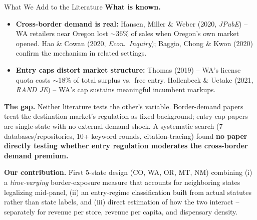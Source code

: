 \documentclass[aspectratio=169,11pt]{beamer}
\begin{document}
\begin{frame}{What We Add to the Literature}
\textbf{What is known.}
\begin{itemize}
\item \textbf{Cross-border demand is real:} Hansen, Miller \& Weber (2020, \emph{JPubE}) -- WA retailers near
Oregon lost $\sim$36\% of sales when Oregon's own market opened. Hao \& Cowan (2020, \emph{Econ.\ Inquiry});
Baggio, Chong \& Kwon (2020) confirm the mechanism in related settings.
\item \textbf{Entry caps distort market structure:} Thomas (2019) -- WA's license quota costs $\sim$18\% of
total surplus vs.\ free entry. Hollenbeck \& Uetake (2021, \emph{RAND JE}) -- WA's cap sustains meaningful
incumbent markups.
\end{itemize}

\vspace{0.4em}
\textbf{The gap.} Neither literature tests the other's variable. Border-demand papers treat the destination
market's regulation as fixed background; entry-cap papers are single-state with no external demand shock. A
systematic search (7 databases/repositories, 10+ keyword rounds, citation-tracing) found \textbf{no paper
directly testing whether entry regulation moderates the cross-border demand premium.}

\vspace{0.4em}
\textbf{Our contribution.} First 5-state design (CO, WA, OR, MT, NM) combining (i) a \emph{time-varying}
border-exposure measure that accounts for neighboring states legalizing mid-panel, (ii) an entry-regime
classification built from actual statutes rather than state labels, and (iii) direct estimation of how the
two interact -- separately for revenue per store, revenue per capita, and dispensary density.
\end{frame}
\end{document}
